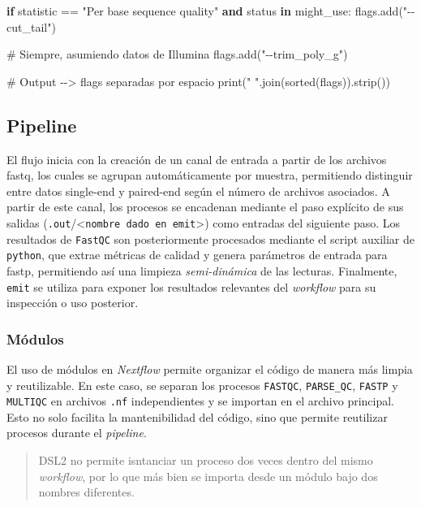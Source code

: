 \documentclass[
  letterpaper,
  DIV=11,
  numbers=noendperiod]{scrartcl}
\newenvironment{Shaded}{\begin{snugshade}}{\end{snugshade}}
\newcommand{\BuiltInTok}[1]{\textcolor[rgb]{0.00,0.23,0.31}{#1}}
\newcommand{\CommentTok}[1]{\textcolor[rgb]{0.37,0.37,0.37}{#1}}
\newcommand{\ControlFlowTok}[1]{\textcolor[rgb]{0.00,0.23,0.31}{\textbf{#1}}}
\newcommand{\KeywordTok}[1]{\textcolor[rgb]{0.00,0.23,0.31}{\textbf{#1}}}
\newcommand{\NormalTok}[1]{\textcolor[rgb]{0.00,0.23,0.31}{#1}}
\newcommand{\OperatorTok}[1]{\textcolor[rgb]{0.37,0.37,0.37}{#1}}
\newcommand{\StringTok}[1]{\textcolor[rgb]{0.13,0.47,0.30}{#1}}
\begin{document}
\begin{Shaded}
\begin{Highlighting}[]
      \ControlFlowTok{if}\NormalTok{ statistic }\OperatorTok{==} \StringTok{"Per base sequence quality"} \KeywordTok{and}\NormalTok{ status }\KeywordTok{in}\NormalTok{ might\_use:}
\NormalTok{        flags.add(}\StringTok{"{-}{-}cut\_tail"}\NormalTok{)}

\CommentTok{\# Siempre, asumiendo datos de Illumina}
\NormalTok{flags.add(}\StringTok{"{-}{-}trim\_poly\_g"}\NormalTok{)}

\CommentTok{\# Output {-}{-}\textgreater{} flags separadas por espacio}
\BuiltInTok{print}\NormalTok{(}\StringTok{" "}\NormalTok{.join(}\BuiltInTok{sorted}\NormalTok{(flags)).strip())}
\end{Highlighting}
\end{Shaded}

\subsection{Pipeline}\label{pipeline}

El flujo inicia con la creación de un canal de entrada a partir de los
archivos fastq, los cuales se agrupan automáticamente por muestra,
permitiendo distinguir entre datos single-end y paired-end según el
número de archivos asociados. A partir de este canal, los procesos se
encadenan mediante el paso explícito de sus salidas
(\texttt{.out}/\textless{}\texttt{nombre\ dado\ en\ emit}\textgreater)
como entradas del siguiente paso. Los resultados de \texttt{FastQC} son
posteriormente procesados mediante el script auxiliar de
\texttt{python}, que extrae métricas de calidad y genera parámetros de
entrada para fastp, permitiendo así una limpieza \emph{semi-dinámica} de
las lecturas. Finalmente, \texttt{emit} se utiliza para exponer los
resultados relevantes del \emph{workflow} para su inspección o uso
posterior.

\subsubsection{Módulos}\label{muxf3dulos}

El uso de módulos en \emph{Nextflow} permite organizar el código de
manera más limpia y reutilizable. En este caso, se separan los procesos
\texttt{FASTQC}, \texttt{PARSE\_QC}, \texttt{FASTP} y \texttt{MULTIQC}
en archivos \texttt{.nf} independientes y se importan en el archivo
principal. Esto no solo facilita la mantenibilidad del código, sino que
permite reutilizar procesos durante el \emph{pipeline}.

\begin{quote}
DSL2 no permite isntanciar un proceso dos veces dentro del mismo
\emph{workflow}, por lo que más bien se importa desde un módulo bajo dos
nombres diferentes.
\end{quote}
\end{document}
